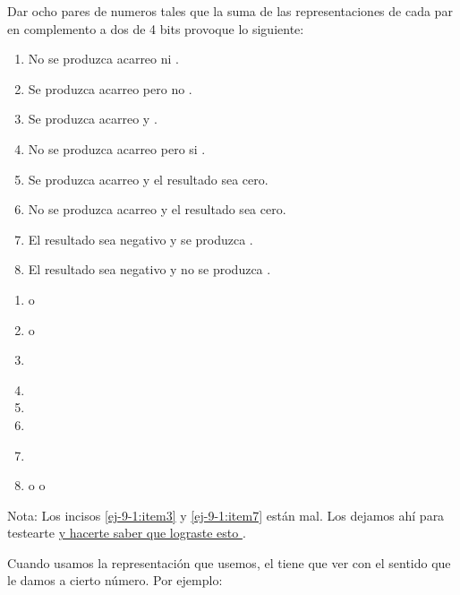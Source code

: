 \begin{enunciado}{\ejercicio}
  Dar ocho pares de numeros tales que la suma de las representaciones de cada
  par en complemento a dos de 4 bits provoque lo siguiente:

  \begin{enumerate}[label=\arabic*)]
    \item No se produzca acarreo ni \overflow.
    \item Se produzca acarreo pero no \overflow.
    \item Se produzca acarreo y \overflow.
    \item No se produzca acarreo pero si \overflow.
    \item Se produzca acarreo y el resultado sea cero.
    \item No se produzca acarreo y el resultado sea cero.
    \item El resultado sea negativo y se produzca \overflow.
    \item El resultado sea negativo y no se produzca \overflow.
  \end{enumerate}
\end{enunciado}

\begin{enumerate}[label=\arabic*)]
  \item {} o 
  \item {} o 
  \item\label{ej-9-1:item3} 
  \item {}
  \item {}
  \item {}
  \item\label{ej-9-1:item7} 
  \item {} o  o 
\end{enumerate}

Nota: Los incisos \ref{ej-9-1:item3} y \ref{ej-9-1:item7} están mal. Los dejamos ahí para
testearte \href{\ariane5}{y hacerte saber que lograste esto }.\par

Cuando usamos la representación que usemos, el \overflow tiene que ver con el sentido que le damos
a cierto número. Por ejemplo:\par

